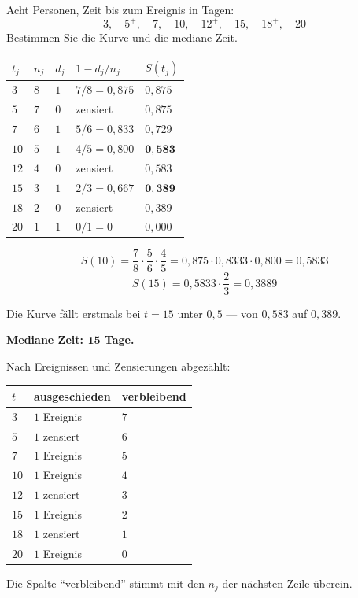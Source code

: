 \begin{aufgabe}
Acht Personen, Zeit bis zum Ereignis in Tagen:
\[ 3,\quad 5^{+},\quad 7,\quad 10,\quad 12^{+},\quad 15,\quad 18^{+},\quad 20 \]
Bestimmen Sie die Kurve und die mediane Zeit.

\loesung
{}
\begin{center}
{\small
\renewcommand{\arraystretch}{1.4}
\begin{tabular}{@{}P{1.2cm}P{1.2cm}P{1.2cm}P{2.2cm}P{1.8cm}@{}}
\toprule
$t_j$ & $n_j$ & $d_j$ & $1-d_j/n_j$ & $S(t_j)$\\
\midrule
$3$ & $8$ & $1$ & $7/8 = 0{,}875$ & $0{,}875$\\
$5$ & $7$ & $0$ & \textcolor{grau}{zensiert} & $0{,}875$\\
$7$ & $6$ & $1$ & $5/6 = 0{,}833$ & $0{,}729$\\
$10$ & $5$ & $1$ & $4/5 = 0{,}800$ & $\mathbf{0{,}583}$\\
$12$ & $4$ & $0$ & \textcolor{grau}{zensiert} & $0{,}583$\\
$15$ & $3$ & $1$ & $2/3 = 0{,}667$ & $\mathbf{0{,}389}$\\
$18$ & $2$ & $0$ & \textcolor{grau}{zensiert} & $0{,}389$\\
$20$ & $1$ & $1$ & $0/1 = 0$ & $0{,}000$\\
\bottomrule
\end{tabular}}
\end{center}

\[ S(10) = \frac{7}{8}\cdot\frac{5}{6}\cdot\frac{4}{5} = 0{,}875 \cdot 0{,}8333 \cdot 0{,}800 = 0{,}5833 \]
\[ S(15) = 0{,}5833 \cdot \frac{2}{3} = 0{,}3889 \]

Die Kurve fällt erstmals bei $t = 15$ unter $0{,}5$ --- von $0{,}583$ auf $0{,}389$.

\textbf{Mediane Zeit: $\mathbf{15}$ Tage.}

Nach Ereignissen und Zensierungen abgezählt:
\begin{center}
{\small
\renewcommand{\arraystretch}{1.35}
\begin{tabular}{@{}P{1.2cm}P{2.4cm}P{2.4cm}@{}}
\toprule
$t$ & \textbf{ausgeschieden} & \textbf{verbleibend}\\
\midrule
$3$ & $1$ Ereignis & $7$\\
$5$ & $1$ zensiert & $6$\\
$7$ & $1$ Ereignis & $5$\\
$10$ & $1$ Ereignis & $4$\\
$12$ & $1$ zensiert & $3$\\
$15$ & $1$ Ereignis & $2$\\
$18$ & $1$ zensiert & $1$\\
$20$ & $1$ Ereignis & $0$\\
\bottomrule
\end{tabular}}
\end{center}
Die Spalte \enquote{verbleibend} stimmt mit den $n_j$ der nächsten Zeile überein. \checkmark


\end{aufgabe}
